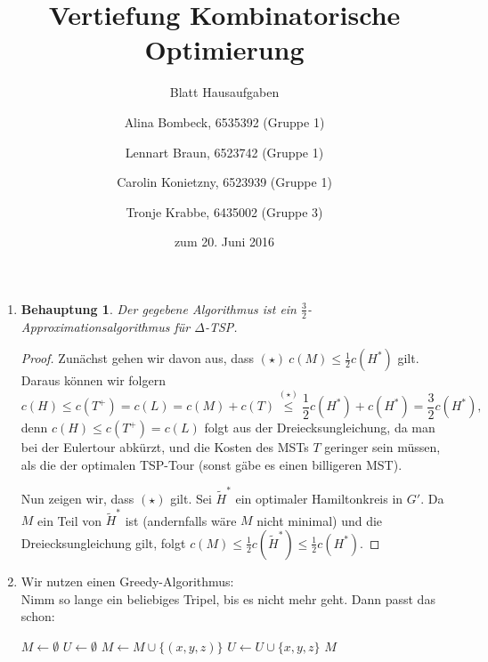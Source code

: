 \documentclass[a4paper]{scrartcl}
\title{Vertiefung Kombinatorische Optimierung}
\subtitle{Blatt {\blattnr} Hausaufgaben}
\author{%
    Alina Bombeck, 6535392 (Gruppe 1) \and
    Lennart Braun, 6523742 (Gruppe 1) \and
    Carolin Konietzny, 6523939 (Gruppe 1) \and
    Tronje Krabbe, 6435002 (Gruppe 3)
}
\date{zum 20. Juni 2016}
\newcommand{\approxalg}[1]{$#1$-Ap\-pro\-xi\-ma\-ti\-ons\-al\-go\-rith\-mus}
\newtheorem*{proposition}{Behauptung}
\begin{document}
\maketitle


\begin{enumerate}[label=\bfseries \arabic*.]
\item %
    \begin{proposition}
        Der gegebene Algorithmus ist ein \approxalg{\frac{3}{2}} für $\Delta$-TSP.
    \end{proposition}
    \begin{proof}
        Zunächst gehen wir davon aus, dass $(\star)\ c(M) \leq \frac{1}{2} c(H^*)$ gilt.
        Daraus können wir folgern
        \begin{equation*}
            c(H)
            \leq c(T^+) = c(L) = c(M) + c(T)
            \stackrel{(\star)}{\leq} \frac{1}{2} c(H^*) + c(H^*) = \frac{3}{2} c(H^*),
        \end{equation*}
        denn $c(H) \leq c(T^+) = c(L)$ folgt aus der Dreiecksungleichung, da man
        bei der Eulertour abkürzt, und die Kosten des MSTs $T$ geringer sein
        müssen, als die der optimalen TSP-Tour (sonst gäbe es einen billigeren
        MST).

        Nun zeigen wir, dass $(\star)$ gilt.
        Sei $\tilde{H}^\ast$ ein optimaler Hamiltonkreis in $G'$. Da $M$ ein
        Teil von $\tilde{H}^\ast$ ist (andernfalls wäre $M$ nicht minimal) und
        die Dreiecksungleichung gilt, folgt
        $c(M) \leq  \frac{1}{2}c(\tilde{H}^\ast) \leq \frac{1}{2}c(H^\ast)$.
    \end{proof}

\item %
    Wir nutzen einen Greedy-Algorithmus:\\
    Nimm so lange ein beliebiges Tripel, bis es nicht mehr geht.
    Dann passt das schon:
    \begin{algorithm}
        \begin{algorithmic}[1]
            \State $M \gets \emptyset$
            \State $U \gets \emptyset$
                \State $M \gets M \cup \{(x,y,z)\}$
                \State $U \gets U \cup \{x,y,z\}$
            \EndIf
            \EndFor
            \State \Return $M$
            \EndProcedure
        \end{algorithmic}
    \end{algorithm}


\end{enumerate}
\end{document}
